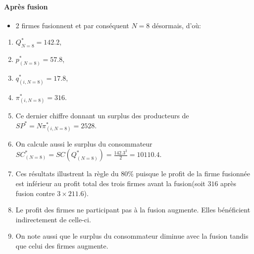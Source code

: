 \documentclass[notes, ignorenonframetext, compress, 10pt, xcolor=svgnames, aspectratio=169]{beamer}
\begin{document}
\begin{frame}[allowframebreaks]{\insertsection}
    \framesubtitle{Après fusion}
    \begin{itemize}
        \item 2 firmes fusionnent et par conséquent $N=8$ désormais, d'où:
    \end{itemize}
        \begin{enumerate}[$\star$]
            \item $Q^*_{N=8} = 142.2$, 
            \item $p^*_{(N=8)}=57.8$, 
            \item $q_{(i, N=8)}^* = 17.8$,  
            \item $\pi_{(i, N=8)}^*= 316$. 
            \item Ce dernier chiffre donnant un surplus des producteurs de 
            $SP^* = N\pi_{(i, N=8)}^*=2528$.
            \item On calcule aussi le surplus du consommateur  
            $SC_{(N=8)}^* = SC(Q_{(N=8)}^*) = \frac{142.3^2}{2} = 10110.4$.
            \framebreak
            \item Ces résultats illustrent la règle du 80\% puisque le profit de la firme fusionnée 
            est inférieur au profit total des trois firmes avant la fusion(soit $316$ 
            après fusion contre $3\times 211.6$). 
            \item Le profit des firmes ne participant pas à la fusion augmente. 
            Elles bénéficient indirectement de celle-ci.
            \item On note aussi que le surplus du consommateur diminue 
            avec la fusion tandis que celui des firmes augmente.
        \end{enumerate}
\end{frame}
\end{document}
